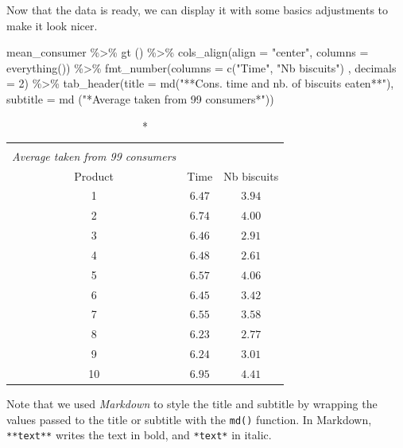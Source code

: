 \documentclass[
]{krantz}
\makeatletter
\newenvironment{Shaded}{\begin{snugshade}}{\end{snugshade}}
\newcommand{\AttributeTok}[1]{\textcolor[rgb]{0.61,0.61,0.61}{#1}}
\newcommand{\DecValTok}[1]{\textcolor[rgb]{0.06,0.06,0.06}{#1}}
\newcommand{\FunctionTok}[1]{\textcolor[rgb]{0,0,0}{#1}}
\newcommand{\NormalTok}[1]{#1}
\newcommand{\SpecialCharTok}[1]{\textcolor[rgb]{0,0,0}{#1}}
\newcommand{\StringTok}[1]{\textcolor[rgb]{0.5,0.5,0.5}{#1}}
\newenvironment{kframe}{%
\medskip{}
\setlength{\fboxsep}{.8em}
 \def\at@end@of@kframe{}%
 \ifinner\ifhmode%
  \def\at@end@of@kframe{\end{minipage}}%
  \begin{minipage}{\columnwidth}%
 \fi\fi%
 \def\FrameCommand##1{\hskip\@totalleftmargin \hskip-\fboxsep
 \colorbox{shadecolor}{##1}\hskip-\fboxsep
     \hskip-\linewidth \hskip-\@totalleftmargin \hskip\columnwidth}%
 \MakeFramed {\advance\hsize-\width
   \@totalleftmargin\z@ \linewidth\hsize
   \@setminipage}}%
 {\par\unskip\endMakeFramed%
 \at@end@of@kframe}
\renewenvironment{Shaded}{\begin{kframe}}{\end{kframe}}
\makeatother
\begin{document}
Now that the data is ready, we can display it with some basics adjustments to make it look nicer.

\begin{Shaded}
\begin{Highlighting}[]
\NormalTok{mean\_consumer }\SpecialCharTok{\%\textgreater{}\%}
  \FunctionTok{gt}\NormalTok{ () }\SpecialCharTok{\%\textgreater{}\%}
  \FunctionTok{cols\_align}\NormalTok{(}\AttributeTok{align =} \StringTok{"center"}\NormalTok{, }\AttributeTok{columns =} \FunctionTok{everything}\NormalTok{()) }\SpecialCharTok{\%\textgreater{}\%}
  \FunctionTok{fmt\_number}\NormalTok{(}\AttributeTok{columns =} \FunctionTok{c}\NormalTok{(}\StringTok{"Time"}\NormalTok{, }\StringTok{"Nb biscuits"}\NormalTok{) , }\AttributeTok{decimals =} \DecValTok{2}\NormalTok{) }\SpecialCharTok{\%\textgreater{}\%}
  \FunctionTok{tab\_header}\NormalTok{(}\AttributeTok{title =} \FunctionTok{md}\NormalTok{(}\StringTok{"**Cons. time and nb. of biscuits eaten**"}\NormalTok{), }
             \AttributeTok{subtitle =} \FunctionTok{md}\NormalTok{ (}\StringTok{"*Average taken from 99 consumers*"}\NormalTok{))}
\end{Highlighting}
\end{Shaded}

\begin{longtable}{ccc}
\caption*{
{\large \textbf{Cons. time and nb. of biscuits eaten}} \\ 
{\small \emph{Average taken from 99 consumers}}
} \\ 
\toprule
Product & Time & Nb biscuits \\ 
\midrule
1 & $6.47$ & $3.94$ \\ 
2 & $6.74$ & $4.00$ \\ 
3 & $6.46$ & $2.91$ \\ 
4 & $6.48$ & $2.61$ \\ 
5 & $6.57$ & $4.06$ \\ 
6 & $6.45$ & $3.42$ \\ 
7 & $6.55$ & $3.58$ \\ 
8 & $6.23$ & $2.77$ \\ 
9 & $6.24$ & $3.01$ \\ 
10 & $6.95$ & $4.41$ \\ 
\bottomrule
\end{longtable}

Note that we used \emph{Markdown} to style the title and subtitle by wrapping the values passed to the title or subtitle with the \texttt{md()} function. In Markdown, \texttt{**text**} writes the text in bold, and \texttt{*text*} in italic.
\end{document}
